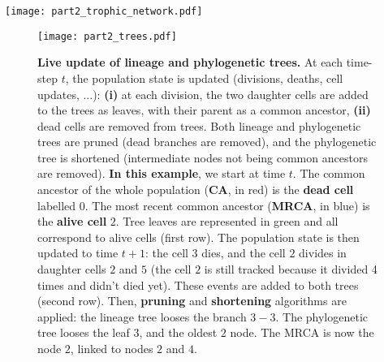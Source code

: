 \begin{figurehere}
\centering 
\texttt{[image: part2\_trophic\_network.pdf]}
\caption[A basic example of trophic network.]{\textbf{A basic example of trophic network.} A basic example of a trophic network, as it is computed in {\EvoEvoSim}, is presented here. Exogenously provided metabolites are represented by a black node tagged \texttt{ENV}. Trophic profiles (\textit{i.e.}, a group of cells having the exact same metabolic activity) exclusively feeding on exogenous metabolites belong to the level 0, and are represented by purple nodes. Trophic profiles feeding on exogenous metabolites and on by-products of other cells belong to level 1 ; they are represented by blue nodes. Trophic profiles exclusively feeding on by-products are represented by green nodes (level 2). Trophic profiles having no metabolic activity are represented by grey nodes. Here, one level 0 profile feeds on the environment, one level 1 profile feeds on the environment and on profile 0, one level 2 profile feeds on profiles 0 and 1, and one profile has no metabolic activity (no level).}
\label{fig:part2:methodology:trophic_network}
\end{figurehere}


\begin{figure}[!h]
\centering 
\texttt{[image: part2\_trees.pdf]}
\caption[Live update of lineage and phylogenetic trees.]{\textbf{Live update of lineage and phylogenetic trees.} At each time-step $t$, the population state is updated (divisions, deaths, cell updates, ...): \textbf{(i)} at each division, the two daughter cells are added to the trees as leaves, with their parent as a common ancestor, \textbf{(ii)} dead cells are removed from trees. Both lineage and phylogenetic trees are pruned (dead branches are removed), and the phylogenetic tree is shortened (intermediate nodes not being common ancestors are removed). \textbf{In this example}, we start at time $t$. The common ancestor of the whole population (\textbf{CA}, in red) is the \textbf{dead cell} labelled $0$. The most recent common ancestor (\textbf{MRCA}, in blue) is the \textbf{alive cell} $2$. Tree leaves are represented in green and all correspond to alive cells (first row). The population state is then updated to time $t+1$: the cell $3$ dies, and the cell $2$ divides in daughter cells $2$ and $5$ (the cell $2$ is still tracked because it divided 4 times and didn't died yet). These events are added to both trees (second row). Then, \textbf{pruning} and \textbf{shortening} algorithms are applied: the lineage tree looses the branch $3-3$. The phylogenetic tree looses the leaf $3$, and the oldest $2$ node. The MRCA is now the node $2$, linked to nodes $2$ and $4$.}
\label{fig:part2:methodology:trees}
\end{figure}

